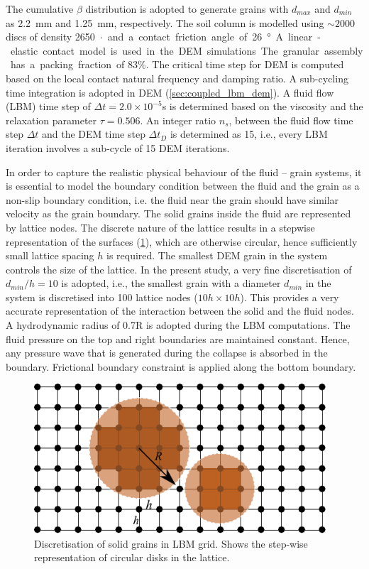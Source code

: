 The cumulative $\beta$ distribution is adopted to generate grains with 
$d_{max}$ and $d_{min}$ as 2.2~\si{\mm} and 1.25~\si{\mm}, respectively. The 
soil column is modelled using $\sim 2000$ discs of density 
\SI{2650}{\kg$\cdot$\per\cubic\meter} and a contact friction angle of 
\SI{26}{\degree}. A linear-elastic contact model is used in the
DEM simulations. The granular assembly has a packing fraction of $83\%$. The 
critical time step for DEM is computed based on the local 
contact natural frequency and damping ratio. A sub-cycling time integration is 
adopted in DEM (\cref{sec:coupled_lbm_dem}). A fluid flow (LBM) time step 
of $\Delta t = 2.0\times 10^{-5}$\si{\s} is determined based on the viscosity 
and the relaxation parameter $\tau = 0.506$. An integer ratio $n_s$, between 
the fluid flow time step $\Delta t$ and the DEM time step $\Delta t_D$ is 
determined as 15, i.e., every LBM iteration involves a sub-cycle of 15 DEM 
iterations.

In order to capture the realistic physical behaviour of the fluid – grain 
systems, it is essential to model the boundary condition between the fluid and 
the grain as a non-slip boundary condition, i.e. the fluid near the grain 
should have similar velocity as the grain boundary. The solid grains inside the 
fluid are represented by lattice nodes. The discrete nature of the lattice 
results in a stepwise representation of the surfaces (\cref{fig:LBM-DEM}), 
which are otherwise circular, hence sufficiently small lattice spacing $h$ is 
required. The smallest DEM grain in the system controls the size of the 
lattice. In the present study, a very fine discretisation of $d_{min}/h = 10$ 
is adopted, i.e., the smallest grain with a diameter $d_{min}$ in the system is 
discretised into 100 lattice nodes ($ 10h \times 10h$). This provides a very 
accurate representation of the interaction between the solid and the fluid 
nodes.  A hydrodynamic radius of 0.7R is adopted during the LBM computations. 
The fluid pressure on the top and right boundaries are maintained constant. 
Hence, any pressure wave that is generated during the collapse is absorbed in 
the boundary. Frictional boundary constraint is applied along the bottom 
boundary.

\begin{figure}[htpb]
\centering
\includegraphics[width=0.97\textwidth]{LBM-DEM}
\caption{Discretisation of solid grains in LBM grid. Shows the step-wise 
representation of circular disks in the lattice.}
\label{fig:LBM-DEM}
\end{figure}


